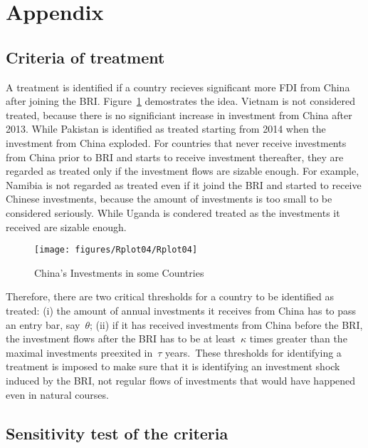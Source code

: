 \documentclass[10pt,a4paper]{article}
\newcommand{\beginsupplement}{%
        \setcounter{table}{0}
        \renewcommand{\thetable}{A\arabic{table}}%
        \setcounter{figure}{0}
        \renewcommand{\thefigure}{A\arabic{figure}}%
     }
\begin{document}
\section{Appendix}
\label{sec:appendix}
\beginsupplement

\subsection{Criteria of treatment}

{\label{639717}}

A treatment is identified if a country recieves significant more FDI
from China after joining the BRI. Figure~{\ref{554014}}
demostrates the idea. Vietnam is not considered treated, because there
is no significiant increase in investment from China after 2013. While
Pakistan is identified as treated starting from 2014 when the investment
from China exploded. For countries that never receive investments from
China prior to BRI and starts to receive investment thereafter, they are
regarded as treated only if the investment flows are sizable enough. For
example, Namibia is not regarded as treated even if it joind the BRI and
started to receive Chinese investments, because the amount of
investments is too small to be considered seriously. While Uganda is
condered treated as the investments it received are sizable enough.
\begin{figure}[H]
\begin{center}
\texttt{[image: figures/Rplot04/Rplot04]}
\caption{{China's Investments in some Countries
{\label{554014}}%
}}
\end{center}
\end{figure}

Therefore, there are two critical thresholds for a country to be
identified as treated: (i) the amount of annual investments it receives
from China has to pass an entry bar, say~\(\theta\); (ii) if it
has received investments from China before the BRI, the investment flows
after the BRI has to be at least~\(\kappa\) times greater than
the maximal investments preexited in~\(\tau\) years.~These
thresholds for identifying a treatment is imposed to make sure that it
is identifying an investment shock induced by the BRI, not regular flows
of investments that would have happened even in natural courses.~

\subsection{Sensitivity test of the
criteria}
\end{document}
